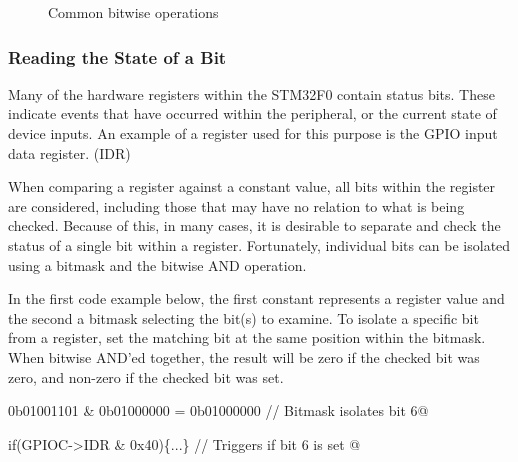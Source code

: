 \documentclass[11pt,fleqn]{book} %
\makeatletter
\newcommand{\ilcode}[1]{
    \smallskip
    \colorbox{gray!20!white}{
        \centering
        \parbox{\linewidth-2\fboxsep}{
            \lstinline@#1@
        }
    }
}
\newcommand{\code}[3]{
    \begin{figure}[]
        \begin{center}
            \hspace*{-3.4cm}
            \colorbox{gray!20!white}{
                \parbox{0.8\paperwidth} {
                    
                }
            }
            \caption{#2}
            \label{#3}
        \end{center}
    \end{figure}
}
\makeatother
\begin{document}
\code{./files/bitops.c}{Common bitwise operations}{bitwise}

%        






\subsubsection{Reading the State of a Bit}

Many of the hardware registers within the STM32F0 contain status bits. These indicate events that have occurred within the peripheral, or the current state of device inputs. An example of a register used for this purpose is the GPIO input data register. (IDR)

When comparing a register against a constant value, all bits within the register are considered, including those that may have no relation to what is being checked. Because of this, in many cases, it is desirable to separate and check the status of a single bit within a register. Fortunately, individual bits can be isolated using a bitmask and the bitwise AND operation. 

\begin{example} 
In the first code example below, the first constant represents a register value and the second a bitmask selecting the bit(s) to examine. To isolate a specific bit from a register, set the matching bit at the same position within the bitmask. When bitwise AND'ed together, the result will be zero if the checked bit was zero, and non-zero if the checked bit was set. 

\ilcode{0b01001101 \& 0b01000000 = 0b01000000  // Bitmask isolates bit 6}

\ilcode{if(GPIOC->IDR \& 0x40)\{...\} // Triggers if bit 6 is set }
\smallskip
\end{example}
\end{document}

